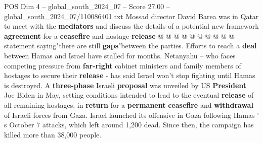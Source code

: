 \begin{textsample}{POS Dim 4 – global\_south\_2024\_07 – Score 27.00 – global\_south\_2024\_07/110086401.txt}
Mossad director David Barea was in Qatar to meet with the \textbf{mediators} and discuss the details of a potential new framework \textbf{agreement} for a \textbf{ceasefire} and hostage \textbf{release} @ @ @ @ @ @ @ @ @ @ statement saying"there are still \textbf{gaps}"between the parties.
Efforts to reach a \textbf{deal} between Hamas and Israel have stalled for months.
Netanyahu -- who faces competing pressure from \textbf{far-right} cabinet ministers and family members of hostages to secure their \textbf{release} - has said Israel won't stop fighting until Hamas is destroyed.
A \textbf{three-phase} Israeli \textbf{proposal} was unveiled by US \textbf{President} Joe Biden in May, setting conditions intended to lead to the eventual \textbf{release} of all remaining hostages, in \textbf{return} for a \textbf{permanent} \textbf{ceasefire} and \textbf{withdrawal} of Israeli forces from Gaza.
Israel launched its offensive in Gaza following Hamas ' s October 7 attacks, which left around 1,200 dead.
Since then, the campaign has killed more than 38,000 people.

\end{textsample}
